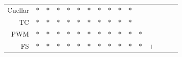 \documentclass[11pt]{article}
\begin{document}
\begin{table}[h!]
\begin{center}
\begin{tabular}{ rccccccccccccccc }
    Cuellar & $*$ & $*$ & $*$ & $*$ & $*$ & $*$ & $*$ & $*$ & $*$ & $*$ &     &     &     &     &     \\
    TC & $*$ & $*$ & $*$ & $*$ & $*$ & $*$ & $*$ & $*$ & $*$ & $*$ &     &     &     &     &     \\
    PWM & $*$ & $*$ & $*$ & $*$ & $*$ & $*$ & $*$ & $*$ & $*$ & $*$ & $*$ &     &     &     &     \\
    FS & $*$ & $*$ & $*$ & $*$ & $*$ & $*$ & $*$ & $*$ & $*$ & $*$ & $*$ & $+$ &     &     &     \\
    \hline
  \end{tabular}
\end{center}
\vspace{0.0cm}
\end{table}
\end{document}
